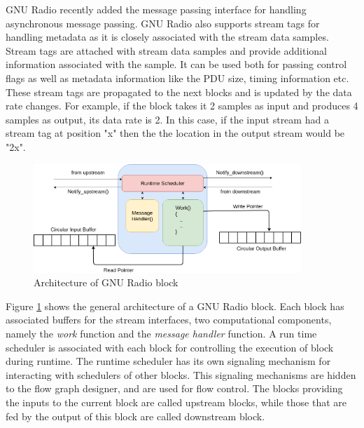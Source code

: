 GNU Radio recently added the message passing interface for handling asynchronous message passing.
GNU Radio also supports stream tags for handling metadata as it is closely associated with the stream data samples.
Stream tags are attached with stream data samples and provide additional information associated with the sample.
It can be used both for passing control flags as well as metadata information like the \ac{PDU} size, timing information etc.
These stream tags are propagated to the next blocks and is updated by the data rate changes.
For example, if the block takes it 2 samples as input and produces 4 samples as output, its data rate is 2.
In this case, if the input stream had a stream tag at position "x" then the the location in the output stream would be "2x". \\


\begin{figure}[h!]
\centering
\includegraphics[width=0.9\textwidth]{Figure/Block.png}
\caption{Architecture of GNU Radio block}
\label{block_arch}
\end{figure}

Figure \ref{block_arch} shows the general architecture of a GNU Radio block. 
Each block has associated buffers for the stream interfaces, two computational components, namely the \textit{work} function and the \textit{message handler} function.
A run time scheduler is associated with each block for controlling the execution of block during runtime. The runtime scheduler has its own signaling mechanism for interacting with schedulers of other blocks.
This signaling mechanisms are hidden to the flow graph designer, and are used for flow control.
The blocks providing the inputs to the current block are called upstream blocks, while those that are fed by the output of this block are called downstream block.\\

